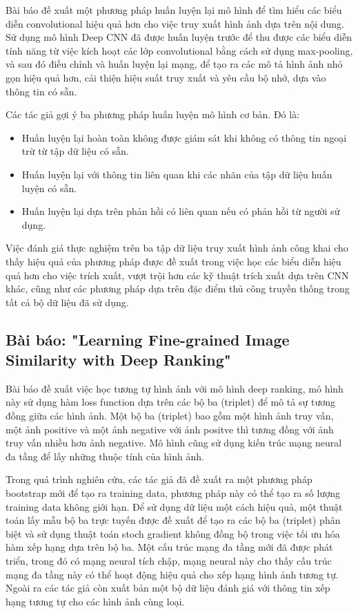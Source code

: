 \documentclass[a4paper,14pt]{extreport}
\begin{document}
Bài báo đề xuất một phương pháp huấn luyện lại mô hình để tìm hiểu các biểu diễn convolutional hiệu quả hơn cho việc truy xuất hình ảnh dựa trên nội dung. Sử dụng mô hình Deep CNN đã được huấn luyện trước để thu được các biểu diễn tính năng từ việc kích hoạt các lớp convolutional bằng cách sử dụng max-pooling, và sau đó điều chỉnh và huấn luyện lại mạng, để tạo ra các mô tả hình ảnh nhỏ gọn hiệu quả hơn, cải thiện hiệu suất truy xuất và yêu cầu bộ nhớ, dựa vào thông tin có sẵn. 

Các tác giả gợi ý ba phương pháp huấn luyện mô hình cơ bản. 
Đó là:
\begin{itemize}
        \item Huấn luyện lại hoàn toàn không được giám sát khi không có thông tin ngoại trừ từ tập dữ liệu có sẵn. 
        \item Huấn luyện lại với thông tin liên quan khi các nhãn của tập dữ liệu huấn luyện có sẵn.
        \item Huấn luyện lại dựa trên phản hồi có liên quan nếu có phản hồi từ người sử dụng. 
\end{itemize}

Việc đánh giá thực nghiệm trên ba tập dữ liệu truy xuất hình ảnh công khai cho thấy hiệu quả của phương pháp được đề xuất trong việc học các biểu diễn hiệu quả hơn cho việc trích xuất, vượt trội hơn các kỹ thuật trích xuất dựa trên CNN khác, cũng như các phương pháp dựa trên đặc điểm thủ công truyền thống trong tất cả bộ dữ liệu đã sử dụng.

\subsection{Bài báo: "Learning Fine-grained Image Similarity with Deep Ranking" \cite{paper-5}}

Bài báo đề xuất việc học tương tự hình ảnh với mô hình deep ranking, mô hình này sử dụng hàm loss function dựa trên các bộ ba (triplet) để mô tả sự tương đồng giữa các hình ảnh. Một bộ ba (triplet) bao gồm một hình ảnh truy vấn, một ảnh positive và một ảnh negative với ảnh positve thì tương đồng với ảnh truy vấn nhiều hơn ảnh negative. Mô hình cũng sử dụng kiến trúc mạng neural đa tầng để lấy những thuộc tính của hình ảnh. 

Trong quá trình nghiên cứu, các tác giả đã đề xuất ra một phương pháp bootstrap mới để tạo ra training data, phương pháp này có thể tạo ra số lượng training data không giới hạn. Để sử dụng dữ liệu một cách hiệu quả, một thuật toán lấy mẫu bộ ba trực tuyến được đề xuất để tạo ra các bộ ba (triplet) phân biệt và sử dụng thuật toán stoch gradient không đồng bộ trong việc tối ưu hóa hàm xếp hạng dựa trên bộ ba. Một cấu trúc mạng đa tầng mới đã được phát triển, trong đó có mạng neural tích chập, mạng neural này cho thấy cấu trúc mạng đa tầng này có thể hoạt động hiệu quả cho xếp hạng hình ảnh tương tự. Ngoài ra các tác giả còn xuất bản một bộ dữ liệu đánh giá với thông tin  xếp hạng tương tự cho các hình ảnh cùng loại.
\end{document}
